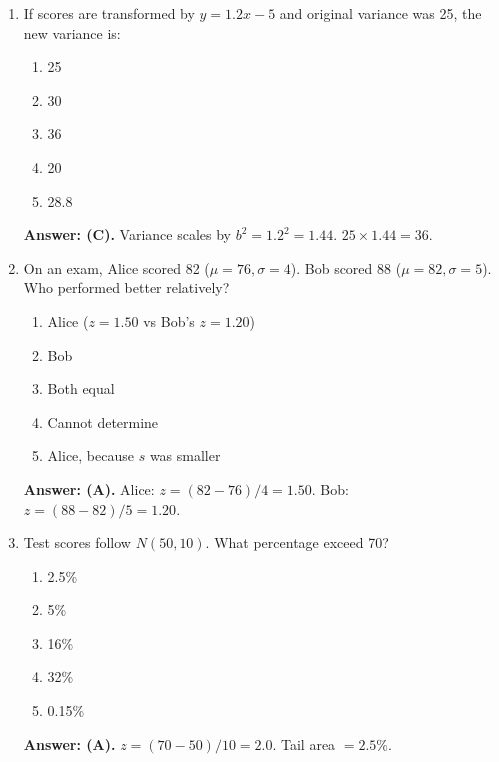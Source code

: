 \begin{enumerate}[leftmargin=1.5em]
  \item If scores are transformed by $y = 1.2x - 5$ and original variance was 25, the new variance is:
  \begin{enumerate}[label=(\Alph*)]
    \item 25 \item 30 \item 36 \item 20 \item 28.8
  \end{enumerate}
  \textbf{Answer: (C).} Variance scales by $b^2 = 1.2^2 = 1.44$. $25 \times 1.44 = 36$.

  \item On an exam, Alice scored 82 ($\mu=76, \sigma=4$). Bob scored 88 ($\mu=82, \sigma=5$). Who performed better relatively?
  \begin{enumerate}[label=(\Alph*)]
    \item Alice ($z = 1.50$ vs Bob's $z = 1.20$) \item Bob \item Both equal \item Cannot determine \item Alice, because $s$ was smaller
  \end{enumerate}
  \textbf{Answer: (A).} Alice: $z = (82-76)/4 = 1.50$. Bob: $z = (88-82)/5 = 1.20$.

  \item Test scores follow $N(50, 10)$. What percentage exceed 70?
  \begin{enumerate}[label=(\Alph*)]
    \item 2.5\% \item 5\% \item 16\% \item 32\% \item 0.15\%
  \end{enumerate}
  \textbf{Answer: (A).} $z = (70-50)/10 = 2.0$. Tail area $= 2.5\%$.
\end{enumerate}

